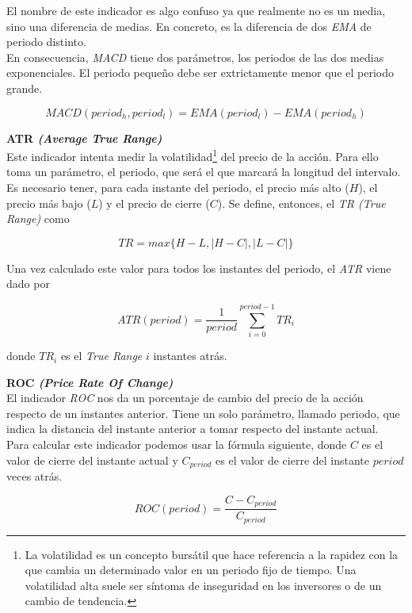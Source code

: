 \begin{appendices}
El nombre de este indicador es algo confuso ya que realmente no es un media, sino una diferencia de medias. En concreto, es la diferencia de dos \textit{EMA} de periodo distinto.\\

En consecuencia, \textit{MACD} tiene dos par\'ametros, los periodos de las dos medias exponenciales. El periodo peque\~no debe ser extrictamente menor que el periodo grande.

\[MACD(period_h, period_l) = EMA(period_l) - EMA(period_h)\] 

\vspace{0.5cm}
\noindent\textbf{ATR \textit{(Average True Range)}}\\

Este indicador intenta medir la volatilidad\footnote{La volatilidad es un concepto burs\'atil que hace referencia a la rapidez con la que cambia un determinado valor en un periodo fijo de tiempo. Una volatilidad alta suele ser s\'intoma de inseguridad en los inversores o de un cambio de tendencia.} del precio de la acci\'on. Para ello toma un par\'ametro, el periodo, que ser\'a el que marcar\'a la longitud del intervalo. Es necesario tener, para cada instante del periodo, el precio m\'as alto ($H$), el precio m\'as bajo ($L$) y el precio de cierre ($C$). Se define, entonces, el \textit{TR (True Range)} como 

\[TR = max\{ H-L, |H-C|, |L-C|\}\]

Una vez calculado este valor para todos los instantes del periodo, el \textit{ATR} viene dado por

\[ATR(period) = \frac{1}{period}\sum\limits_{i=0}^{period-1}TR_{i}\]

donde $TR_{i}$ es el \textit{True Range} $i$ instantes atr\'as.

\vspace{0.5cm}
\noindent\textbf{ROC \textit{(Price Rate Of Change)}}\\

El indicador \textit{ROC} nos da un porcentaje de cambio del precio de la acci\'on respecto de un instantes anterior. Tiene un solo par\'ametro, llamado periodo, que indica la distancia del instante anterior a tomar respecto del instante actual.\\

Para calcular este indicador podemos usar la f\'ormula siguiente, donde $C$ es el valor de cierre del instante actual y $C_{period}$ es el valor de cierre del instante $period$ veces atr\'as.

\[ROC(period) = \frac{C - C_{period}}{C_{period}}\]

\end{appendices}
